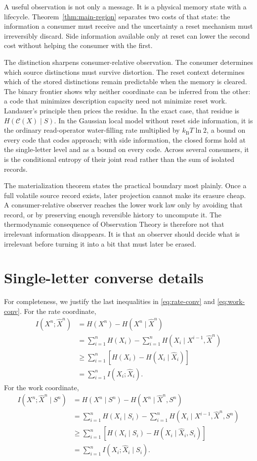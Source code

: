 \documentclass[letterpaper,onecolumn]{IEEEtran}
\theoremstyle{definition}
\theoremstyle{remark}
\newcommand{\cC}{\mathcal{C}}
\newcommand{\hX}{\widehat{X}}
\newcommand{\hXn}{\widehat{X}^{n}}
\newcommand{\1}{\mathbf{1}}
\newcommand{\kb}{k_{\mathrm B}}
\begin{document}
A useful observation is not only a message. It is a physical memory state with
a lifecycle. Theorem~\ref{thm:main-region} separates two costs of that state:
the information a consumer must receive and the uncertainty a reset mechanism
must irreversibly discard. Side information available only at reset can lower
the second cost without helping the consumer with the first.

The distinction sharpens consumer-relative observation. The consumer determines
which source distinctions must survive distortion. The reset context determines
which of the stored distinctions remain predictable when the memory is cleared.
The binary frontier shows why neither coordinate can be inferred from the
other: a code that minimizes description capacity need not minimize reset work.
Landauer's principle then prices the residue. In the exact case, that residue is
$H(\cC(X)\mid S)$. In the Gaussian local model without reset side information, it
is the ordinary read-operator water-filling rate multiplied by $\kb T\ln2$, a bound
on every code that codes approach; with side information, the closed forms hold at
the single-letter level and as a bound on every code. Across several consumers, it is the
conditional entropy of their joint read rather than the sum of isolated records.

The materialization theorem states the practical boundary most plainly. Once a
full volatile source record exists, later projection cannot make its erasure
cheap. A consumer-relative observer reaches the lower work law only by avoiding
that record, or by preserving enough reversible history to uncompute it. The
thermodynamic consequence of Observation Theory is therefore not that irrelevant
information disappears. It is that an observer should decide what is irrelevant
before turning it into a bit that must later be erased.

\appendices

\section{Single-letter converse details}\label{app:converse}

For completeness, we justify the last inequalities in
\eqref{eq:rate-conv} and \eqref{eq:work-conv}. For the rate coordinate,
\begin{align}
 I(X^n;\hXn)
 &=H(X^n)-H(X^n\mid\hXn)\nonumber\\
 &=\sum_{i=1}^{n}H(X_i)
   -\sum_{i=1}^{n}H(X_i\mid X^{i-1},\hXn)\nonumber\\
 &\ge\sum_{i=1}^{n}\left[H(X_i)-H(X_i\mid\hX_i)\right]\nonumber\\
 &=\sum_{i=1}^{n}I(X_i;\hX_i).
\end{align}
For the work coordinate,
\begin{align}
 I(X^n;\hXn\mid S^n)
 &=H(X^n\mid S^n)-H(X^n\mid\hXn,S^n)\nonumber\\
 &=\sum_{i=1}^{n}H(X_i\mid S_i)
   -\sum_{i=1}^{n}H(X_i\mid X^{i-1},\hXn,S^n)\nonumber\\
 &\ge\sum_{i=1}^{n}
 \left[H(X_i\mid S_i)-H(X_i\mid\hX_i,S_i)\right]\nonumber\\
 &=\sum_{i=1}^{n}I(X_i;\hX_i\mid S_i).
\end{align}
\end{document}
